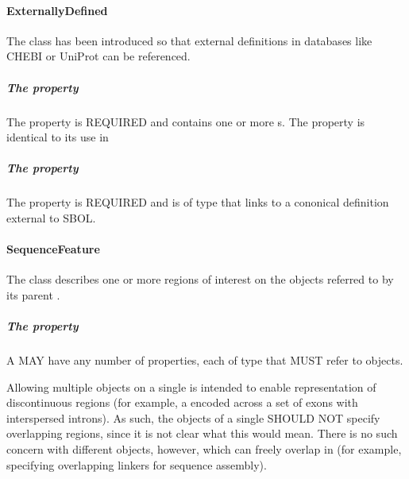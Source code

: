 \paragraph{ExternallyDefined}
\label{sec:ExternallyDefined}

The  class has been introduced so that external definitions in databases like CHEBI or UniProt can be referenced.

\subparagraph{The  property}\label{sec:type:ED}

The  property is REQUIRED and contains one or more s. The  property is identical to its use in 

\subparagraph{The  property}\label{sec:definition:ER}

The  property is REQUIRED and is of type  that links to a cononical definition external to SBOL.

\paragraph{SequenceFeature}
\label{sec:SequenceFeature}

The  class describes one or more regions of interest on the  objects referred to by its parent . 

\subparagraph{The  property}\label{sec:hasLocation:SF}

A  MAY have any number of  properties, each of type  that MUST refer to  objects. 

Allowing multiple  objects on a single  is intended to enable representation of discontinuous regions (for example, a  encoded across a set of exons with interspersed introns).
As such, the  objects of a single  SHOULD NOT specify overlapping regions, since it is not clear what this would mean.
There is no such concern with different  objects, however, which can freely overlap in  (for example, specifying overlapping linkers for sequence assembly).
